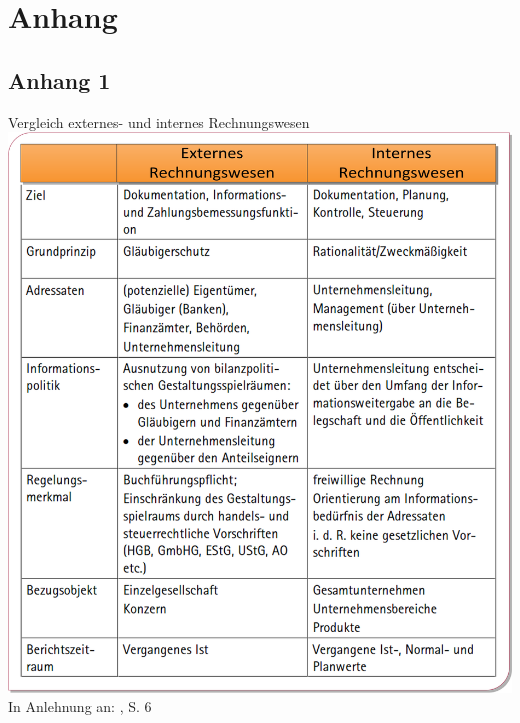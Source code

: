 \newpage
\section{Anhang}
\subsection{Anhang 1}
\label{sec:Anhang1}
\begin{table}[htbp]
\begin{center}
Vergleich externes- und internes Rechnungswesen
\includegraphics[width=1\textwidth]{Images/VergleichIntExt.png}
\label{abb1}
{\footnotesize In Anlehnung an: \cite{Lojewski2001}, S. 6}
\end{center}
\end{table} 
\newpage

